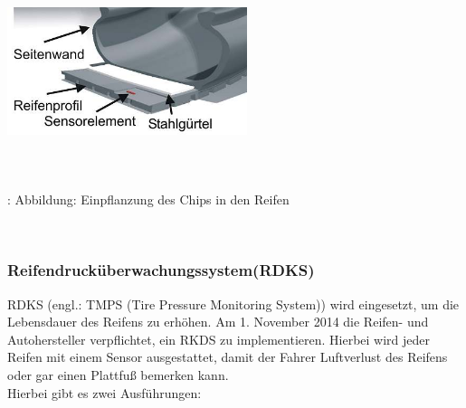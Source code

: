 \documentclass{article}
\begin{document}
				\begin{center}
					\includegraphics[width=7cm, height=5cm] {Images/Kapitel5/reifensensor.png}
					\caption {\\\cite{TS19}: Abbildung: Einpflanzung des Chips in den Reifen}
				\end{center}\\
			
			
			\subsubsection{Reifendrucküberwachungssystem(RDKS)}
				RDKS (engl.: TMPS (Tire Pressure Monitoring System)) wird eingesetzt, um die Lebensdauer des Reifens zu erhöhen. Am 1. November 2014 die Reifen- und Autohersteller verpflichtet, ein RKDS zu implementieren. Hierbei wird jeder Reifen mit einem Sensor ausgestattet, damit der Fahrer Luftverlust des Reifens oder gar einen Plattfuß bemerken kann.\\
				Hierbei gibt es zwei Ausführungen:
				
\end{document}
